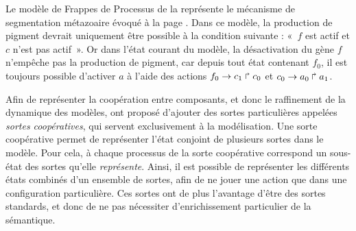 \begin{example}
  Le modèle de Frappes de Processus de la 
  représente le mécanisme de segmentation métazoaire évoqué à la page
  .
  Dans ce modèle, la production de pigment devrait uniquement être possible
  à la condition suivante : «~$f$ est actif et $c$ n'est pas actif~».
  Or dans l'état courant du modèle,
  la désactivation du gène $f$ n'empêche pas la production de pigment,
  car depuis tout état contenant $f_0$, il est toujours possible d'activer $a$
  à l'aide des actions $f_0\rightarrow c_1\Rsh c_0$ et $c_0\rightarrow a_0\Rsh a_1$.
\end{example}

Afin de représenter la coopération entre composants,
et donc le raffinement de la dynamique des modèles,
 ont proposé d'ajouter des sortes particulières appelées
\emph{sortes coopératives}, qui servent exclusivement à la modélisation.
Une sorte coopérative permet de représenter l'état conjoint de plusieurs sortes dans le modèle.
Pour cela, à chaque processus de la sorte coopérative correspond un sous-état des sortes
qu'elle \emph{représente}.
Ainsi, il est possible de représenter les différents états combinés d'un ensemble de sortes,
afin de ne jouer une action que dans une configuration particulière.
Ces sortes ont de plus l'avantage d'être des sortes standards,
et donc de ne pas nécessiter d'enrichissement particulier de la sémantique.

